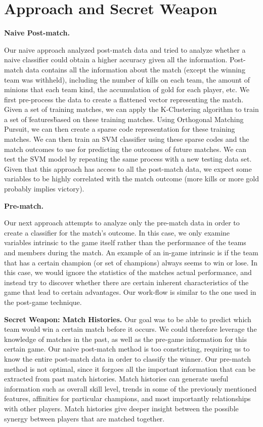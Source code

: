 \section{Approach and Secret Weapon  }

\textbf{Naive Post-match. }

Our naive approach analyzed post-match data and tried to analyze whether a 
naive classifier could obtain a higher accuracy given all the information.  
Post-match data contains all the information about the match (except the winning 
team was withheld), including the number of kills on each team, the amount of minions 
that each team kind, the accumulation of gold for each player, etc.  We first pre-process 
the data to create a flattened vector representing the match.  
Given a set of training matches, we can apply the K-Clustering algorithm to train a 
set of \"features\" based on these training matches.  Using Orthogonal Matching Pursuit, we can then create a sparse code representation for these training matches.  
We can then train an SVM classifier using these sparse codes and the 
match outcomes to use for predicting the outcomes of future matches.  
We can test the SVM model by repeating the same process with a new testing data set.  Given that this approach has access to all the post-match data, 
we expect some variables to be highly correlated with the match 
outcome (more kills or more gold probably implies victory).

\textbf{Pre-match. }

Our next approach attempts to analyze only the pre-match data in order to create 
a classifier for the match's outcome.  In this case, we only examine variables 
intrinsic to the game itself rather than the performance of the teams and members 
during the match.  An example of an in-game intrinsic is if the team that has a 
certain champion (or set of champions) always seems 
to win or lose.  In this case, we would ignore the statistics of the matches 
actual performance, and instead try to discover whether there are certain inherent 
characteristics of the game that lead to certain advantages.  Our work-flow is similar 
to the one used in the post-game technique.

\textbf{Secret Weapon: Match Histories.  }
Our goal was to be able to predict which team would win a certain match before it occurs. 
We could therefore leverage the knowledge of matches in the past, as well as the pre-game 
information for this certain game.  Our naive post-match method is too constricting, 
requiring us to know the entire post-match data in order to classify the winner.  Our pre-match 
method is not optimal, since it forgoes all the important information that can be extracted 
from past match histories.  Match histories can generate useful information such as 
overall skill level, trends in some of the previously mentioned features, 
affinities for particular champions, and most importantly relationships with other 
players.  Match histories give deeper insight between the possible synergy between 
players that are matched together.  

